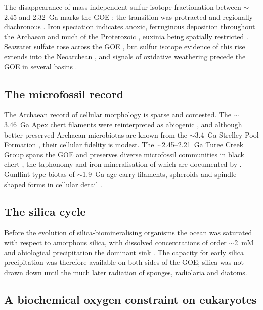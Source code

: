 \documentclass[11pt]{article}
\begin{document}
The disappearance of mass-independent sulfur isotope fractionation between $\sim$2.45 and 2.32~Ga
marks the GOE \citep{Holland2006,Bekker2004,Pavlov2002,Farquhar2000}; the transition was protracted
and regionally diachronous \citep{Lyons2014,Philippot2018}. Iron speciation indicates anoxic,
ferruginous deposition throughout the Archaean and much of the Proterozoic
\citep{Canfield1998,Poulton2005,Poulton2011}, euxinia being spatially restricted
\citep{Reinhard2009}. Seawater sulfate rose across the GOE \citep{Habicht2002,Kah2004,Crowe2014},
but sulfur isotope evidence of this rise extends into the Neoarchean \citep{Reinhard2009}, and
signals of oxidative weathering precede the GOE in several basins \citep{Anbar2007}.

\subsection{The microfossil record}

The Archaean record of cellular morphology is sparse and contested. The $\sim$3.46~Ga Apex chert
filaments \citep{Schopf1993} were reinterpreted as abiogenic \citep{Brasier2002}, and although
better-preserved Archaean microbiotas are known from the $\sim$3.4~Ga Strelley Pool Formation
\citep{Sugitani2010,Delarue2020}, their cellular fidelity is modest. The $\sim$2.45--2.21~Ga Turee
Creek Group spans the GOE and preserves diverse microfossil communities in black chert
\citep{Barlow2018}, the taphonomy and iron mineralisation of which are documented by
\citet{Lepot2017b}. Gunflint-type biotas of $\sim$1.9~Ga age carry filaments, spheroids and
spindle-shaped forms in cellular detail \citep{Lepot2017a,Javaux2018}.

\subsection{The silica cycle}

Before the evolution of silica-biomineralising organisms the ocean was saturated with respect to
amorphous silica, with dissolved concentrations of order $\sim$2~mM and abiological precipitation
the dominant sink \citep{Siever1992,Perry2007}. The capacity for early silica precipitation was
therefore available on both sides of the GOE; silica was not drawn down until the much later
radiation of sponges, radiolaria and diatoms.

\subsection{A biochemical oxygen constraint on eukaryotes}
\end{document}
